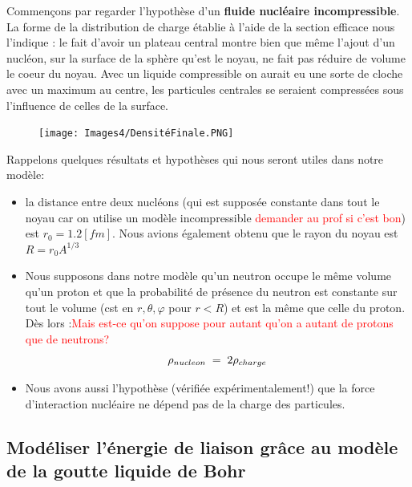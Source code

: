 Commençons par regarder l'hypothèse d'un \textbf{fluide nucléaire incompressible}. La forme de la distribution de charge établie à l'aide de la section efficace nous l'indique : le fait d'avoir un plateau central montre bien que même l'ajout d'un nucléon, sur la surface de la sphère qu'est le noyau, ne fait pas réduire de volume le coeur du noyau. Avec un liquide compressible on aurait eu une sorte de cloche avec un maximum au centre, les particules centrales se seraient compressées sous l'influence de celles de la surface.\\
\begin{figure}
    \centering
    \texttt{[image: Images4/DensitéFinale.PNG]}
\end{figure}
Rappelons quelques résultats et hypothèses qui nous seront utiles dans notre modèle:
\begin{itemize}[label=$\bullet$]
    \item la distance entre deux nucléons (qui est supposée constante dans tout le noyau car on utilise un modèle incompressible \textcolor{red}{demander au prof si c'est bon}) est $r_0 = 1.2[fm]$. Nous avions également obtenu que le rayon du noyau est $R=r_0A^{1/3}$

    \item Nous supposons dans notre modèle qu'un neutron occupe le même volume qu'un proton et que la probabilité de présence du neutron est constante sur tout le volume (cst en $r,\theta,\varphi$ pour $r<R$) et est la même que celle du proton. Dès lors :\textcolor{red}{Mais est-ce qu'on suppose pour autant qu'on a autant de protons que de neutrons?}
    $$ \rho_{nucleon} \; = \; 2 \rho_{charge} $$
    
    \item Nous avons aussi l'hypothèse (vérifiée expérimentalement!) que la force d'interaction nucléaire ne dépend pas de la charge des particules.
\end{itemize}


\subsection{Modéliser l'énergie de liaison grâce au modèle de la goutte liquide de Bohr}



